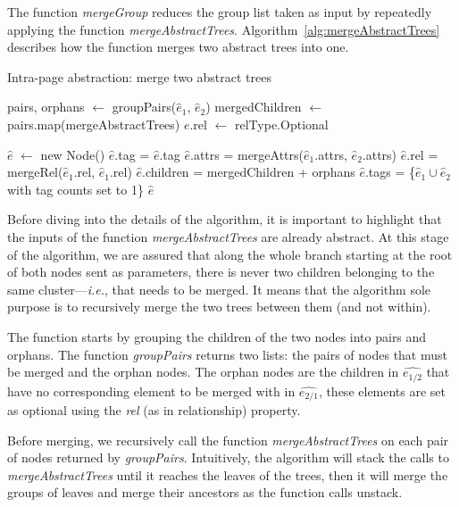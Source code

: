 The function \emph{mergeGroup} reduces the group list taken as input by repeatedly applying the function \emph{mergeAbstractTrees}.
Algorithm~\ref{alg:mergeAbstractTrees} describes how the function merges two abstract trees into one.

\begin{algorithm}
\caption{Intra-page abstraction: merge two abstract trees}\label{alg:mergeAbstractTrees}
\begin{algorithmic}[1]
    \State {}
    \State pairs, orphans $\gets$ groupPairs($\hat{e}_1$, $\hat{e}_2$)
    \State mergedChildren $\gets$ pairs.map(mergeAbstractTrees)
        \State $e$.rel $\gets$ relType.Optional
    \EndFor
    
    \State $\hat{e}$ $\gets$ new Node()
    \State $\hat{e}$.tag = $\hat{e}$.tag
    \State $\hat{e}$.attrs = mergeAttrs($\hat{e}_1$.attrs, $\hat{e}_2$.attrs)
    \State $\hat{e}$.rel = mergeRel($\hat{e}_1$.rel, $\hat{e}_1$.rel)
    \State $\hat{e}$.children = mergedChildren + orphans
    \State $\hat{e}$.tags = \{$\hat{e}_1 \cup \hat{e}_2$ with tag counts set to 1\}
    \State \Return $\hat{e}$
  \EndFunction
\end{algorithmic}
\end{algorithm}

Before diving into the details of the algorithm, it is important to highlight that the inputs of the function \emph{mergeAbstractTrees} are already abstract.
At this stage of the algorithm, we are assured that along the whole branch starting at the root of both nodes sent as parameters, there is never two children belonging to the same cluster---\emph{i.e.}, that needs to be merged.
It means that the algorithm sole purpose is to recursively merge the two trees between them (and not within).

The function starts by grouping the children of the two nodes into pairs and orphans.
The function \emph{groupPairs} returns two lists: the pairs of nodes that must be merged and the orphan nodes. 
The orphan nodes are the children in $\hat{e_{1/2}}$ that have no corresponding element to be merged with in $\hat{e_{2/1}}$, these elements are set as optional using the \emph{rel} (as in relationship) property.

Before merging, we recursively call the function \emph{mergeAbstractTrees} on each pair of nodes returned by \emph{groupPairs}.
Intuitively, the algorithm will stack the calls to \emph{mergeAbstractTrees} until it reaches the leaves of
the trees, then it will merge the groups of leaves and merge their ancestors as the function calls unstack.


